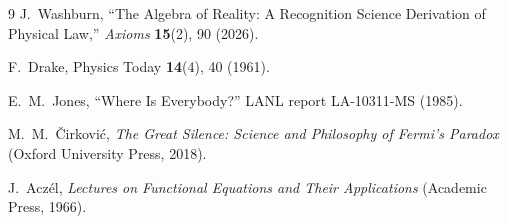 \documentclass[12pt,a4paper]{article}
\theoremstyle{definition}
\theoremstyle{remark}
\begin{document}
\begin{thebibliography}{9}
J.~Washburn, ``The Algebra of Reality: A Recognition Science Derivation
of Physical Law,'' \emph{Axioms} \textbf{15}(2), 90 (2026).

F.~Drake, Physics Today \textbf{14}(4), 40 (1961).

E.~M.~Jones, ``Where Is Everybody?'' LANL report LA-10311-MS (1985).

M.~M.~\v{C}irkovi\'{c}, \emph{The Great Silence: Science and
Philosophy of Fermi's Paradox} (Oxford University Press, 2018).

J.~Acz\'el, \emph{Lectures on Functional Equations and Their
Applications} (Academic Press, 1966).
\end{thebibliography}
\end{document}
